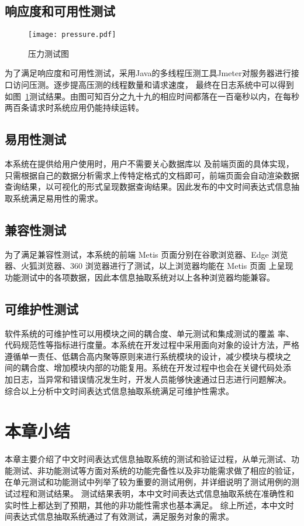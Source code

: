 \subsection{响应度和可用性测试}

\begin{figure}[b]
    \centering
    \texttt{[image: pressure.pdf]}
    \caption{压力测试图}
    \label{fig:pressure}
\end{figure}

为了满足响应度和可用性测试，采用Java的多线程压测工具Jmeter对服务器进行接口访问压测。逐步提高压测的线程数量和请求速度，
最终在日志系统中可以得到如图~\ref{fig:pressure}测试结果。由图可知百分之九十九的相应时间都落在一百毫秒以内，在每秒两百条请求时系统应用仍能持续运转。


\subsection{易用性测试}

本系统在提供给用户使用时，用户不需要关心数据库以
及前端页面的具体实现，只需根据自己的数据分析需求上传特定格式的文档即可，前端页面会自动渲染数据查询结果，以可视化的形式呈现数据查询结果。因此发布的中文时间表达式信息抽取系统满足易用性的需求。

\subsection{兼容性测试}

为了满足兼容性测试，本系统的前端 Metis 页面分别在谷歌浏览器、Edge
浏览器、火狐浏览器、360 浏览器进行了测试，以上浏览器均能在 Metis 页面
上呈现功能测试中的各项数据，因此本信息抽取系统对以上各种浏览器均能兼容。

\subsection{可维护性测试}

软件系统的可维护性可以用模块之间的耦合度、单元测试和集成测试的覆盖
率、代码规范性等指标进行度量。本系统在开发过程中采用面向对象的设计方法，严格
遵循单一责任、低耦合高内聚等原则来进行系统模块的设计，减少模块与模块之
间的耦合度、增加模块内部的功能复用。系统在开发过程中也会在关键代码处添
加日志，当异常和错误情况发生时，开发人员能够快速通过日志进行问题解决。
综合以上分析中文时间表达式信息抽取系统满足可维护性需求。


\section{本章小结}

本章主要介绍了中文时间表达式信息抽取系统的测试和验证过程，从单元测试、功能测试、非功能测试等方面对系统的功能完备性以及非功能需求做了相应的验证，
在单元测试和功能测试中列举了较为重要的测试用例，并详细说明了测试用例的测试过程和测试结果。
测试结果表明，本中文时间表达式信息抽取系统在准确性和实时性上都达到了预期，其他的非功能性需求也基本满足。
综上所述，本中文时间表达式信息抽取系统通过了有效测试，满足服务对象的需求。